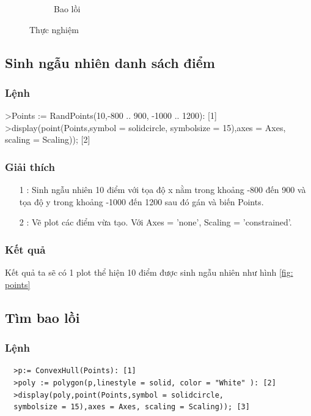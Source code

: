 \documentclass[12pt]{article}
\begin{document}
\begin{figure}
\begin{subfigure}[h]{0.4\linewidth}
            \caption{Bao lồi}
            \label{fig: polych}
          \end{subfigure}
          \caption{Thực nghiệm}
        \end{figure}
        \subsection{Sinh ngẫu nhiên danh sách điểm}
          \subsubsection*{Lệnh}
            \begin{spverbatim}
    >Points := RandPoints(10,-800 .. 900, -1000 .. 1200): [1]
    >display(point(Points,symbol = solidcircle, 
    symbolsize = 15),axes = Axes, scaling = Scaling)); [2]
            \end{spverbatim}
          \subsubsection*{Giải thích}
            \begin{itemize}
              \item [1]: Sinh ngẫu nhiên 10 điểm với tọa độ x nằm trong khoảng -800 đến 900 và tọa độ y trong khoảng -1000 đến 1200 sau đó gán và biến Points.
              \item [2]: Vẽ plot các điểm vừa tạo. Với Axes = 'none', Scaling = 'constrained'. 
            \end{itemize} 
          \subsubsection*{Kết quả} 
            Kết quả ta sẽ có 1 plot thể hiện 10 điểm được sinh ngẫu nhiên như hình \ref{fig: points}
            \newpage
        \subsection{Tìm bao lồi}
            \subsubsection*{Lệnh}
              \begin{verbatim}
  >p:= ConvexHull(Points): [1]
  >poly := polygon(p,linestyle = solid, color = "White" ): [2]
  >display(poly,point(Points,symbol = solidcircle, 
  symbolsize = 15),axes = Axes, scaling = Scaling)); [3]
              \end{verbatim}
\end{document}
